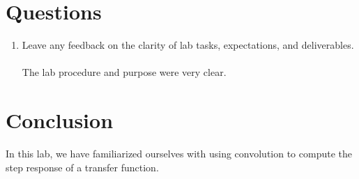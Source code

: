 \documentclass[12pt,a4paper]{article}
\begin{document}

\section{Questions}\label{sec:res}
\begin{enumerate}

    \item
    Leave any feedback on the clarity of lab tasks, expectations, and deliverables.\\
    \\The lab procedure and purpose were very clear.
\end{enumerate}
\section{Conclusion}\label{sec:res}
    In this lab, we have familiarized ourselves with using convolution to compute the step response of a transfer function.


\end{document}

